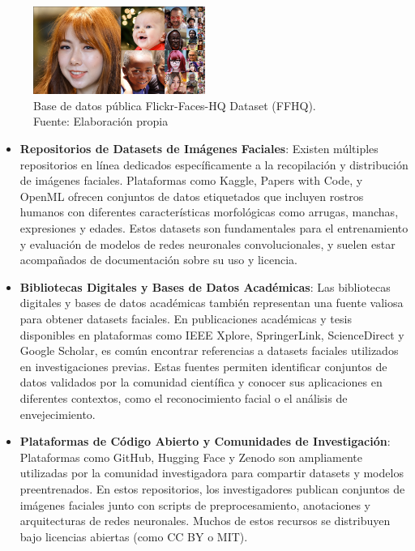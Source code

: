 \begin{figure}[h]
	\begin{center}
		\includegraphics[width=0.5\textwidth]{3/figures/repo_github.png}
		\caption[Base de datos pública Flickr-Faces-HQ Dataset (FFHQ)]{Base de datos pública Flickr-Faces-HQ Dataset (FFHQ).\\
		Fuente: Elaboración propia}
		\label{3:fig2}
	\end{center}
\end{figure}

\begin{itemize}
    \item \textbf{Repositorios de Datasets de Imágenes Faciales}: Existen múltiples repositorios en línea dedicados específicamente a la recopilación y distribución de imágenes faciales. Plataformas como Kaggle, Papers with Code, y OpenML ofrecen conjuntos de datos etiquetados que incluyen rostros humanos con diferentes características morfológicas como arrugas, manchas, expresiones y edades. Estos datasets son fundamentales para el entrenamiento y evaluación de modelos de redes neuronales convolucionales, y suelen estar acompañados de documentación sobre su uso y licencia.
	\item \textbf{Bibliotecas Digitales y Bases de Datos Académicas}: Las bibliotecas digitales y bases de datos académicas también representan una fuente valiosa para obtener datasets faciales. En publicaciones académicas y tesis disponibles en plataformas como IEEE Xplore, SpringerLink, ScienceDirect y Google Scholar, es común encontrar referencias a datasets faciales utilizados en investigaciones previas. Estas fuentes permiten identificar conjuntos de datos validados por la comunidad científica y conocer sus aplicaciones en diferentes contextos, como el reconocimiento facial o el análisis de envejecimiento.
	\item \textbf{Plataformas de Código Abierto y Comunidades de Investigación}: Plataformas como GitHub, Hugging Face y Zenodo son ampliamente utilizadas por la comunidad investigadora para compartir datasets y modelos preentrenados. En estos repositorios, los investigadores publican conjuntos de imágenes faciales junto con scripts de preprocesamiento, anotaciones y arquitecturas de redes neuronales. Muchos de estos recursos se distribuyen bajo licencias abiertas (como CC BY o MIT).
  \end{itemize}


